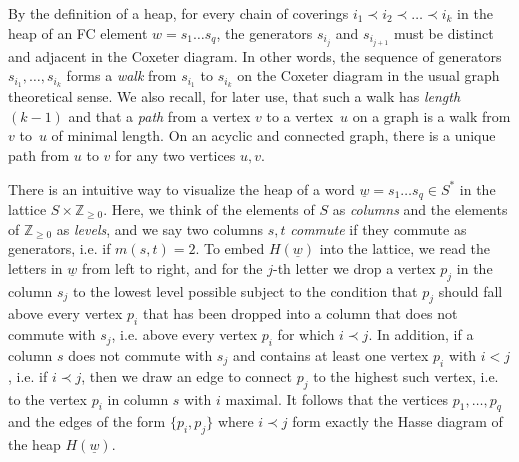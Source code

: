 \documentclass[ALCO,Unicode,published]{cedram}
\newcommand{\Z}{\mathbb{Z}}
\begin{document}
\begin{remark}
    \label{rmk:chainsAndWalks}
    By the definition of a heap, for every chain of coverings $i_1\prec i_2 \prec \dots \prec i_k$ in the
    heap of an FC element $w=s_1\dots s_q$, the generators $s_{i_j}$ and $s_{i_{j+1}}$  must be
    distinct and adjacent in the Coxeter diagram. In other words, the sequence of generators
    $s_{i_1},\dots, s_{i_k}$ forms a \emph{walk} from $s_{i_1}$ to $s_{i_k}$ on the Coxeter diagram
    in the usual graph theoretical sense. We also recall, for later use, that such a walk has
    \emph{length} $(k-1)$ and that a \emph{path} from a vertex $v$ to a vertex~$u$ on a graph is a
    walk from $v$ to~$u$ of minimal length. On an acyclic and connected graph, there is a unique
    path from $u$ to $v$ for any two vertices $u,v$.  
\end{remark}

There is an intuitive way to visualize the heap of a word $\underline w=s_1\dots s_q\in S^*$ in the
lattice $S\times \Z_{\ge 0}$. Here, we think of the elements of $S$ as \emph{columns} and the
elements of $\Z_{\ge 0}$ as \emph{levels}, and we say two columns $s,t$ \emph{commute} if they
commute as generators, i.e. if $m(s,t)= 2$. To embed $H(\underline w)$ into the lattice, we read
the letters in $\underline w$ from left to right, and for the $j$-th letter we drop a vertex $p_j$
in the column $s_j$ to the lowest level possible subject to the condition that $p_j$ should fall
above every vertex $p_i$ that has been dropped into a column that does not commute with $s_j$, i.e.
above every vertex $p_i$ for which $i\prec j$. In addition, if a column $s$ does not commute with
$s_j$ and contains at least one vertex $p_i$ with $i<j$, i.e. if $i\prec j$, then we draw an edge
to connect $p_j$ to the highest such vertex, i.e. to the vertex $p_i$ in column $s$ with $i$
maximal. It follows that the vertices $p_1,\dots, p_q$ and the edges of the form $\{p_i,p_j\}$ where
$i\prec j$ form exactly the Hasse diagram of the heap $H(\underline w)$. 
\end{document}
